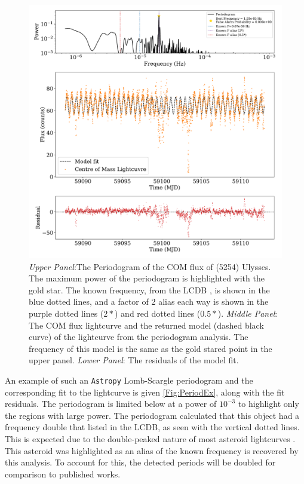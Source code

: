 \documentclass{UCreport}
\begin{document}
\begin{figure}[!t]
  \centering
  \includegraphics[width=\textwidth]{./Figures/PeriodogramUlyssesResid.pdf}
  \caption[Periodogram example]{\textit{Upper Panel}:The Periodogram of the COM flux of (5254) Ulysses.
    The maximum power of the periodogram is highlighted with the gold star.
    The known frequency, from the LCDB \citep{Warner2009}, is shown in the blue dotted lines, and a factor of 2 alias each way is shown in the purple dotted lines ($2*$) and red dotted lines ($0.5*$).
    \textit{Middle Panel}: The COM flux lightcurve and the returned model (dashed black curve) of the lightcurve from the periodogram analysis.
    The frequency of this model is the same as the gold stared point in the upper panel.
    \textit{Lower Panel}: The residuals of the model fit.
  }
  \label{Fig:PeriodEx}
\end{figure}


An example of such an \texttt{Astropy} Lomb-Scargle periodogram and the corresponding fit to the lightcurve is given \autoref{Fig:PeriodEx}, along with the fit residuals.
The periodogram is limited below at a power of $10^{-3}$ to highlight only the regions with large power.
The periodogram calculated that this object had a frequency double that listed in the LCDB, as seen with the vertical dotted lines.
This is expected due to the double-peaked nature of most asteroid lightcurves \citep{McNeill2023}.
This asteroid was highlighted as an alias of the known frequency is recovered by this analysis.
To account for this, the detected periods will be doubled for comparison to published works.
\end{document}
